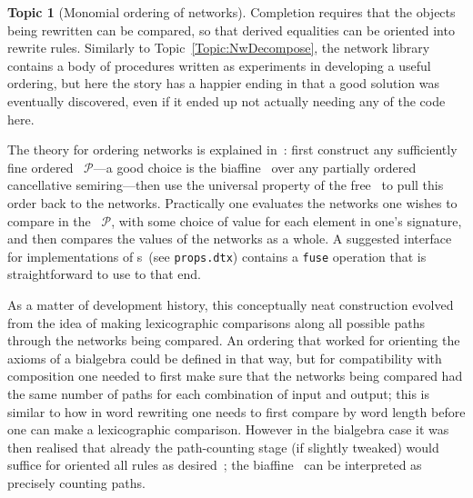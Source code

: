 \documentclass{article}
\theoremstyle{definition}
\newtheorem{topic}{Topic}
\newcommand{\PROP}{\smaller{PROP}}
\newcommand{\PROPs}{\PROP s}
\begin{document}
\begin{topic}[Monomial ordering of networks]
  Completion requires that the objects being rewritten can be 
  compared, so that derived equalities can be oriented into rewrite 
  rules. Similarly to Topic~\ref{Topic:NwDecompose}, the network 
  library contains a body of procedures written as experiments in 
  developing a useful ordering, but here the story has a happier 
  ending in that a good solution was eventually discovered, even if 
  it ended up not actually needing any of the code here.
  
  The theory for ordering networks is explained 
  in~\cite[Sec.~3]{NR1}: first construct any sufficiently fine 
  ordered \PROP\ $\mathcal{P}$---a good choice is the biaffine \PROP\ 
  over any partially ordered cancellative semiring---then use the 
  universal property of the free \PROP\ to pull this order back to 
  the networks. Practically one evaluates the networks one wishes to 
  compare in the \PROP\ $\mathcal{P}$, with some choice of value for 
  each element in one's signature, and then compares the values of the 
  networks as a whole. A suggested interface for implementations of 
  \PROPs~(see \texttt{props.dtx}) contains a \texttt{fuse} operation 
  that is straightforward to use to that end.
  
  As a matter of development history, this conceptually neat 
  construction evolved from the idea of making lexicographic 
  comparisons along all possible paths through the networks being 
  compared. An ordering that worked for orienting the axioms of a 
  bialgebra could be defined in that way, but for compatibility with 
  composition one needed to first make sure that the networks 
  being compared had the same number of paths for each combination of 
  input and output; this is similar to how in word rewriting one 
  needs to first compare by word length before one can make a 
  lexicographic comparison. However in the bialgebra case it was then 
  realised that already the path-counting stage (if slightly tweaked) 
  would suffice for oriented all rules as desired~\cite{LH:WST,NR2}; 
  the biaffine \PROP\ can be interpreted as precisely counting paths.
\end{topic}
\end{document}
